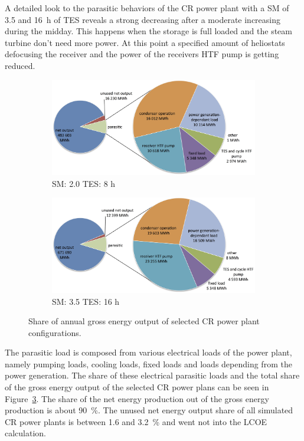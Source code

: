 A detailed look to the parasitic behaviors of the CR power plant with a SM of 3.5 and 16~h of TES reveals a strong decreasing after a moderate increasing during the midday. This happens when the storage is full loaded and the steam turbine don't need more power. At this point a specified amount of heliostats defocusing the receiver and the power of the receivers HTF pump is getting reduced. 

\begin{figure}[!htbp]
        \centering   
        \begin{subfigure}[b]{0.65\textwidth}
                \centering
                \includegraphics[width=1\textwidth]{FIG/CR_parasitics_low}
                \caption{SM: 2.0 TES: 8 h}\label{CR_parasitics_low}
        \end{subfigure}
\par\medskip %
        \begin{subfigure}[b]{0.65\textwidth}
                \centering
                \includegraphics[width=1\textwidth]{FIG/CR_parasitics_high}
                \caption{SM: 3.5 TES: 16 h}\label{CR_parasitics_high}
        \end{subfigure}
        \caption[Share of annual gross energy output of selected CR power plant configurations.]{Share of annual gross energy output of selected CR power plant configurations.}\label{CR_parasitics}
\end{figure}
The parasitic load is composed from various electrical loads of the power plant, namely pumping loads, cooling loads, fixed loads and loads depending from the power generation. The share of these electrical parasitic loads and the total share of the gross energy output of the selected CR power plans can be seen in Figure~\ref{CR_parasitics}. The share of the net energy production out of the gross energy production is about 90~\%. The unused net energy output share of all simulated CR power plants is between 1.6 and 3.2~\% and went not into the LCOE calculation.

